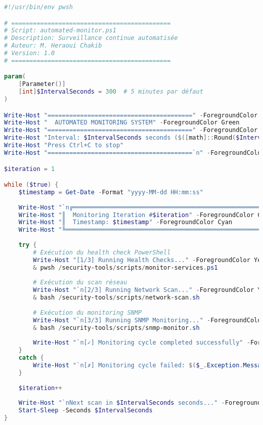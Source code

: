 \documentclass[11pt,a4paper]{report}
\begin{document}
\begin{lstlisting}[language=PowerShell, caption=automated-monitor.ps1 - Monitoring Continu, basicstyle=\ttfamily\tiny]
#!/usr/bin/env pwsh

# ============================================
# Script: automated-monitor.ps1
# Description: Surveillance continue automatisée
# Auteur: M. Heraoui Chakib
# Version: 1.0
# ============================================

param(
    [Parameter()]
    [int]$IntervalSeconds = 300  # 5 minutes par défaut
)

Write-Host "========================================" -ForegroundColor Green
Write-Host "  AUTOMATED MONITORING SYSTEM" -ForegroundColor Green
Write-Host "========================================" -ForegroundColor Green
Write-Host "Interval: $IntervalSeconds seconds ($([math]::Round($IntervalSeconds/60, 2)) minutes)"
Write-Host "Press Ctrl+C to stop"
Write-Host "========================================`n" -ForegroundColor Green

$iteration = 1

while ($true) {
    $timestamp = Get-Date -Format "yyyy-MM-dd HH:mm:ss"
    
    Write-Host "`n╔═══════════════════════════════════════════════════════════╗" -ForegroundColor Cyan
    Write-Host "║  Monitoring Iteration #$iteration" -ForegroundColor Cyan
    Write-Host "║  Timestamp: $timestamp" -ForegroundColor Cyan
    Write-Host "╚═══════════════════════════════════════════════════════════╝`n" -ForegroundColor Cyan
    
    try {
        # Exécution du health check PowerShell
        Write-Host "[1/3] Running Health Checks..." -ForegroundColor Yellow
        & pwsh /security-tools/scripts/monitor-services.ps1
        
        # Exécution du scan réseau
        Write-Host "`n[2/3] Running Network Scan..." -ForegroundColor Yellow
        & bash /security-tools/scripts/network-scan.sh
        
        # Exécution du monitoring SNMP
        Write-Host "`n[3/3] Running SNMP Monitoring..." -ForegroundColor Yellow
        & bash /security-tools/scripts/snmp-monitor.sh
        
        Write-Host "`n[✓] Monitoring cycle completed successfully" -ForegroundColor Green
    }
    catch {
        Write-Host "`n[✗] Monitoring cycle failed: $($_.Exception.Message)" -ForegroundColor Red
    }
    
    $iteration++
    
    Write-Host "`nNext scan in $IntervalSeconds seconds..." -ForegroundColor Gray
    Start-Sleep -Seconds $IntervalSeconds
}
\end{lstlisting}
\end{document}
